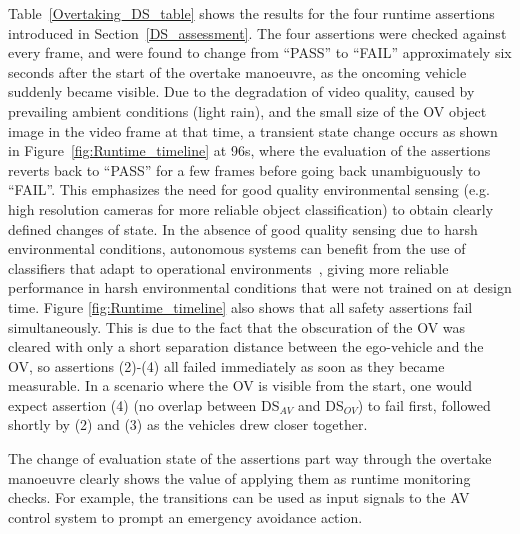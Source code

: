 Table~\ref{Overtaking_DS_table} shows the results for the four runtime assertions introduced in Section~\ref{DS_assessment}. 
%
The four assertions were checked against every frame, and were found to change from ``PASS'' to ``FAIL'' approximately six seconds after the start of the overtake manoeuvre, as the oncoming vehicle suddenly became visible. 
%
Due to the degradation of video quality, caused by prevailing ambient conditions (light rain), and the small size of the OV object image in the video frame at that time, a transient state change occurs as shown in Figure~\ref{fig:Runtime_timeline} at 96s, where the evaluation of the assertions reverts back to ``PASS'' for a few frames before going back unambiguously to ``FAIL''. 
%
This emphasizes the need for good quality environmental sensing (e.g. high resolution cameras for more reliable object classification) to obtain clearly defined changes of state.
%
In the absence of good quality sensing due to harsh environmental conditions, autonomous systems can benefit from the use of classifiers that adapt to operational environments~\cite{ghobrial2022operational}, giving more reliable performance in harsh environmental conditions that were not trained on at design time. 
%
Figure \ref{fig:Runtime_timeline} also shows that all safety assertions fail simultaneously. This is due to the fact that the obscuration of the OV was cleared with only a short separation distance between the ego-vehicle and the OV, so assertions (2)-(4) all failed immediately as soon as they became measurable. In a scenario where the OV is visible from the start, one would expect assertion (4) (no overlap between DS$_{AV}$ and DS$_{OV}$) to fail first, followed shortly by (2) and (3) as the vehicles drew closer together.

The change of evaluation state of the assertions part way through the overtake manoeuvre clearly shows the value of applying them as runtime monitoring checks. For example, the transitions can be used as input signals to the AV control system to prompt an emergency avoidance action.


